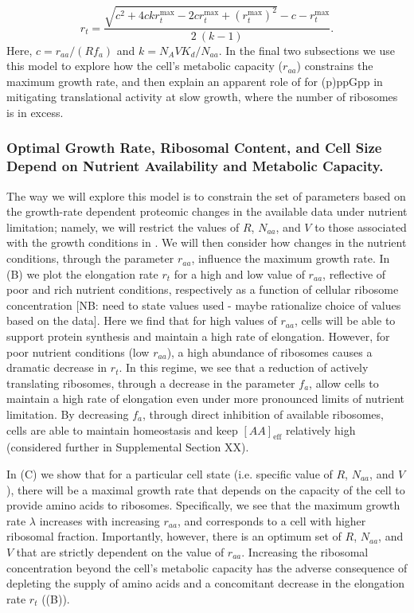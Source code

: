 \begin{equation}
r_t = \frac{\sqrt{c^2 + 4 c k r_{t}^{\text{max}} - 2 c r_{t}^{\text{max}} + (r_{t}^{\text{max}})^2} - c - r_{t}^{\text{max}}}{2 \ (k-1)}.
\label{eq:rt_final}
\end{equation}
Here, $c = r_{aa}/(R f_a)$ and $k = N_A V K_d / N_{aa}$. In the final two
subsections we use this model to explore how the cell's metabolic capacity
($r_{aa}$) constrains the maximum growth rate, and then explain an apparent role
of for (p)ppGpp in mitigating translational activity at slow growth, where the
number of ribosomes is in excess.

\subsubsection{Optimal Growth Rate, Ribosomal Content, and Cell Size Depend on Nutrient
Availability and Metabolic Capacity.}

The way we will explore this model is to constrain the set of parameters based
on the growth-rate dependent proteomic changes in the available data under
nutrient limitation;  namely, we will restrict the values of $R$, $N_{aa}$, and
$V$ to those associated with the growth conditions in \cite{schmidt2016}. We
will then consider how changes in the nutrient conditions, through the parameter
$r_{aa}$, influence the maximum growth rate. In (B) we
plot the elongation rate $r_t$ for a high and low value of $r_{aa}$, reflective
of poor and rich nutrient conditions, respectively as a function of cellular
ribosome concentration [NB: need to state values used - maybe rationalize choice
of values based on the data]. Here we find that for high values of $r_{aa}$,
cells will be able to support protein synthesis and maintain a high rate of
elongation. However, for poor nutrient conditions (low $r_{aa}$), a high
abundance of ribosomes causes a dramatic decrease in $r_t$. In this regime, we
see that a reduction of actively translating ribosomes, through a decrease in
the parameter $f_a$, allow cells to maintain a high rate of elongation even
under more pronounced limits of nutrient limitation. By decreasing $f_a$,
through direct inhibition of available ribosomes, cells are able to maintain
homeostasis and keep $[AA]_{\text{eff}}$ relatively high (considered further in
Supplemental Section XX).

In (C) we show that for a particular cell state (i.e.
specific value of $R$, $N_{aa}$, and $V$), there will be a maximal growth rate
that depends on the capacity of the cell to provide amino acids to ribosomes.
Specifically, we see that the maximum growth rate $\lambda$ increases with
increasing $r_{aa}$, and corresponds to a cell with higher ribosomal fraction.
Importantly, however, there is an optimum  set of $R$, $N_{aa}$, and $V$ that
are strictly dependent on the value of $r_{aa}$. Increasing the ribosomal
concentration beyond the cell's metabolic capacity has the adverse consequence
of depleting the supply of amino acids and a concomitant decrease in the
elongation rate $r_t$ ((B)).


